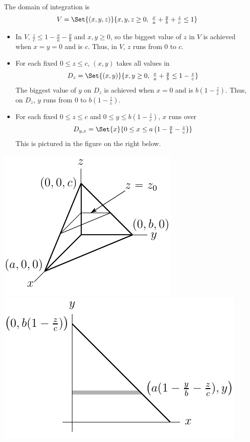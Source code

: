 \begin{solution}
The domain of integration is  
\begin{equation*}
V=\Set{(x,y,z)}{x,y,z\ge 0,\ \tfrac{x}{a}+\tfrac{y}{b}+\tfrac{z}{c}\le 1}
\end{equation*}
\begin{itemize}
\item
In $V$, $\tfrac{z}{c}\le 1-\tfrac{x}{a}-\tfrac{y}{b}$ and $x,y\ge0$, so
the biggest value of $z$ in $V$ is achieved when $x=y=0$ and is $c$. 
Thus, in $V$, $z$ runs from $0$ to $c$.
\item
For each fixed $0\le z\le c$, $(x,y)$ takes all values in
\begin{equation*}
D_z=\Set{(x,y)}{x,y\ge 0,\ \tfrac{x}{a}+\tfrac{y}{b}\le 1-\tfrac{z}{c}}
\end{equation*}
The biggest value of $y$ on $D_z$ is achieved when $x=0$ and is $b\left(1-\tfrac{z}{c}\right)$. Thus, on $D_z$, $y$ runs from $0$ to 
$b\left(1-\tfrac{z}{c}\right)$.
\item
For each fixed $0\le z\le c$ and
 $0\le y \le b\left(1-\tfrac{z}{c}\right)$, $x$ runs over
\begin{equation*}
D_{y,z}=\Set{x}{0\le x \le a\left(1-\tfrac{y}{b}-\tfrac{z}{c}\right)}
\end{equation*}
This is pictured in the figure on the right below.
\end{itemize}

\begin{center}
     \includegraphics{fig/domainTetrahedron.pdf}\qquad
     \includegraphics{fig/domainTetrahedron2.pdf}
\end{center} 


\end{solution}
